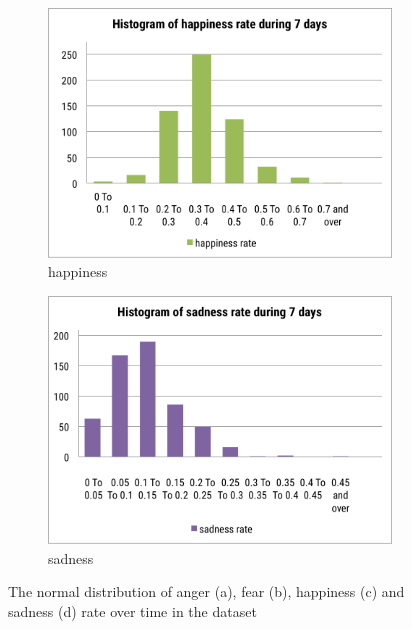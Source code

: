 \begin{figure}[htb!]
\begin{subfigure}{0.5\textwidth}
\end{subfigure}
\begin{subfigure}{0.5\textwidth}
\centering    
\includegraphics[width=0.8\linewidth]{HistogramHappinessWeek}
\caption{happiness}
\label{fig:histogramHappinessWeek}
\end{subfigure}%
\begin{subfigure}{0.5\textwidth}
\centering    
\includegraphics[width=0.8\linewidth]{HistogramSadnessWeek}
\caption{sadness}
\label{fig:histogramSadnessWeek}
\end{subfigure}
\caption{The normal distribution of anger (a), fear (b), happiness (c) and sadness (d) rate over time in the dataset}
\label{fig:histogramWeek}
\end{figure}

